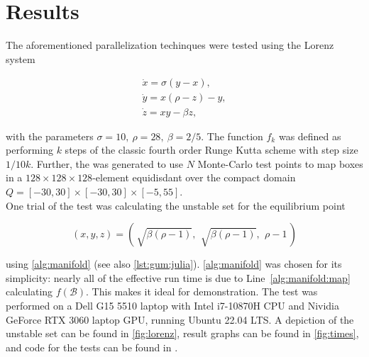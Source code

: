 
\section{Results}

The aforementioned parallelization techinques were tested using the Lorenz system 
\cite*{lorenz}

\begin{gather}
    \dot{x} = \sigma (y - x), \\
    \dot{y} = x (\rho - z) - y, \\
    \dot{z} = xy - \beta z,
\end{gather}

with the parameters $\sigma = 10,\ \rho = 28,\ \beta = 2 / 5$. The function $f_k$ was 
defined as performing $k$ steps of the classic fourth order Runge Kutta scheme 
\cite*{Runge, Kutta} with step 
size $1 / 10 k$. Further, the   was generated to use $N$
Monte-Carlo test points to map boxes in a $128 \times 128 \times 128$-element equidisdant 
 over the compact domain 
$Q = [-30,30] \times [-30,30] \times [-5,55]$. \\

One trial of the test was calculating the unstable set for the equilibrium point 

\begin{equation}
    \label{eq:equilibrium}
    (x, y, z) = \left(\,\sqrt{\beta (\rho - 1)},\,\ \sqrt{\beta (\rho - 1)},\,\ \rho - 1\,\right)
\end{equation}

using \autoref{alg:manifold} (see also \autoref{lst:gum:julia}). \autoref{alg:manifold} 
was chosen for its simplicity: nearly all of the effective run time is due to 
Line~\ref{alg:manifold:map} calculating $f(\mathcal{B})$. This makes it ideal for demonstration. 
The test was performed on a Dell G15 5510 laptop with Intel i7-10870H CPU and Nividia 
GeForce RTX 3060 laptop GPU, running Ubuntu 22.04 LTS. A depiction of the unstable set 
can be found in \autoref{fig:lorenz}, result graphs can be found in \autoref{fig:times}, 
and code for the tests can be found in \cite*{benchmarks}. \\

